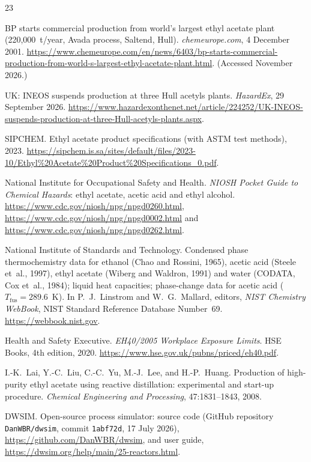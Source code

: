 \documentclass[10pt,a4paper]{article}
\begin{document}
\begingroup
\footnotesize
\justifying
\sloppy
\begin{thebibliography}{23}
\setlength{\itemsep}{2pt}

 BP starts commercial production from world's largest ethyl acetate plant (220,000~t/year, Avada process, Saltend, Hull). \textit{chemeurope.com}, 4 December 2001. \url{https://www.chemeurope.com/en/news/6403/bp-starts-commercial-production-from-world-s-largest-ethyl-acetate-plant.html}. (Accessed November 2026.)

 UK: INEOS suspends production at three Hull acetyls plants. \textit{HazardEx}, 29 September 2026. \url{https://www.hazardexonthenet.net/article/224252/UK-INEOS-suspends-production-at-three-Hull-acetyls-plants.aspx}.

 SIPCHEM. Ethyl acetate product specifications (with ASTM test methods), 2023. \url{https://sipchem.is.sa/sites/default/files/2023-10/Ethyl%20Acetate%20Product%20Specifications_0.pdf}.

 National Institute for Occupational Safety and Health. \textit{NIOSH Pocket Guide to Chemical Hazards}: ethyl acetate, acetic acid and ethyl alcohol. \url{https://www.cdc.gov/niosh/npg/npgd0260.html}, \url{https://www.cdc.gov/niosh/npg/npgd0002.html} and \url{https://www.cdc.gov/niosh/npg/npgd0262.html}.

 National Institute of Standards and Technology. Condensed phase thermochemistry data for ethanol (Chao and Rossini, 1965), acetic acid (Steele et~al., 1997), ethyl acetate (Wiberg and Waldron, 1991) and water (CODATA, Cox et~al., 1984); liquid heat capacities; phase-change data for acetic acid ($T_{\mathrm{fus}} = 289.6$~K). In P.~J.~Linstrom and W.~G.~Mallard, editors, \textit{NIST Chemistry WebBook}, NIST Standard Reference Database Number~69. \url{https://webbook.nist.gov}.

 Health and Safety Executive. \textit{EH40/2005 Workplace Exposure Limits}. HSE Books, 4th edition, 2020. \url{https://www.hse.gov.uk/pubns/priced/eh40.pdf}.

 I.-K.~Lai, Y.-C.~Liu, C.-C.~Yu, M.-J.~Lee, and H.-P.~Huang. Production of high-purity ethyl acetate using reactive distillation: experimental and start-up procedure. \textit{Chemical Engineering and Processing}, 47:1831--1843, 2008.

 DWSIM. Open-source process simulator: source code (GitHub repository \texttt{DanWBR/dwsim}, commit \texttt{1abf72d}, 17 July 2026), \url{https://github.com/DanWBR/dwsim}, and user guide, \url{https://dwsim.org/help/main/25-reactors.html}.


\end{thebibliography}
\end{document}
